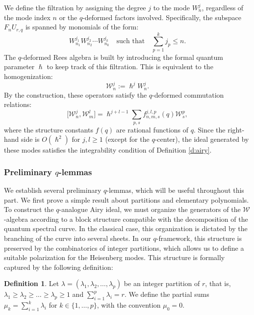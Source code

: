 \documentclass[reqno,11pt]{amsart}
\theoremstyle{plain}
\theoremstyle{definition}
\newtheorem{definition}[theorem]{Definition}
\theoremstyle{remark}
\numberwithin{equation}{section}
\newcommand{\1}{\mathds{1}}
\newcommand{\2}{\frac{1}{2}}
\begin{document}
{				We define the filtration by assigning the degree $j$ to the mode $W^{j}_{n}$, regardless of the mode index $n$ or the $q$-deformed factors involved. Specifically, the subspace $F_nU_{r,q}$ is spanned by monomials of the form:
				\begin{equation}
					W^{j_1}_{n_1} W^{j_2}_{n_2} \cdots W^{j_k}_{n_k} \quad \text{such that} \quad \sum_{p=1}^{k} j_p \leq n.
				\end{equation}
				The $q$-deformed Rees algebra is built by introducing the formal quantum parameter $\hslash$ to keep track of this filtration. This is equivalent to the homogenization:
				\begin{equation}
					\mathcal{W}^j_n := \hslash^j W^j_n.
				\end{equation}
				By the construction, these operators satisfy the $q$-deformed commutation relations:
				\begin{equation}
					\big[\mathcal{W}^j_n, \mathcal{W}^l_m\big] = \hslash^{j+l-1} \sum_{p, s} f_{n,m,s}^{j,l,p}(q) \mathcal{W}^p_s,
				\end{equation}
				where the structure constants $f(q)$ are rational functions of $q$. Since the right-hand side is $O(\hslash^2)$ for $j,l \geq 1$ (except for the $q$-center), the ideal generated by these modes satisfies the integrability condition of Definition \ref{d:airy}.
				
				\subsubsection{Preliminary $q$-lemmas}
				We establish several preliminary $q$-lemmas, which will be useful throughout this part. We first prove a simple result about partitions and elementary  polynomials.
				To construct the $q$-analogue Airy ideal, we must organize the generators of the $\mathcal{W}$-algebra according to a block structure compatible with the decomposition of the quantum spectral curve. In the classical case, this organization is dictated by the branching of the curve into several sheets. In our $q$-framework, this structure is preserved by the combinatorics of integer partitions, which allows us to define a suitable polarization for the Heisenberg modes.
				This structure is formally captured by the following definition:
				\begin{definition}\label{d:ps}
					Let $\lambda = (\lambda_1, \lambda_2, \ldots, \lambda_p)$ be an integer partition of $r$, that is, $\lambda_1 \geq \lambda_2 \geq \ldots \geq \lambda_p \geq 1$ and $\sum_{i=1}^p \lambda_i = r$. We define the partial sums $\mu_k = \sum_{i=1}^k \lambda_i$ for $k \in \{1, \dots, p\}$, with the convention $\mu_0 = 0$.
				\end{definition}
				
}
\end{document}
